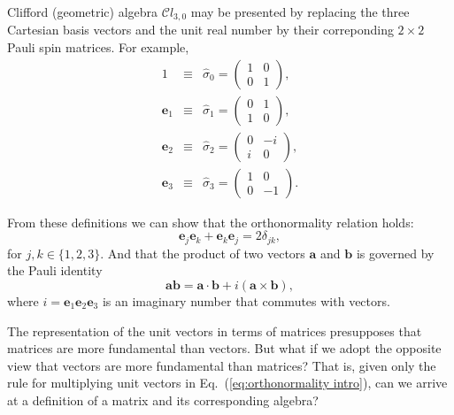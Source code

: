\documentclass[11pt,twocolumn]{article}
\begin{document}
Clifford (geometric) algebra $\mathcal Cl_{3,0}$ may be presented by replacing the three Cartesian basis vectors and the unit real number by their correponding $2\times2$ Pauli spin matrices\cite{Hestenes_1971_ajp39i9pp1013-1027_p1018}.  For example,
\begin{eqnarray}
\label{eq:unit is sigma_0}
1&\equiv&\hat\sigma_0=
\begin{pmatrix}
1&0\\
0&1
\end{pmatrix}
,\\
\label{eq:e_1 is sigma_1}
\mathbf e_1&\equiv&\hat\sigma_1=
\begin{pmatrix}
0&1\\
1&0
\end{pmatrix}
,\\
\label{eq:e_2 is sigma_2}
\mathbf e_2&\equiv&\hat\sigma_2=
\begin{pmatrix}
0&-i\\
i&0
\end{pmatrix}
,\\
\label{eq:e_3 is sigma_3}
\mathbf e_3&\equiv&\hat\sigma_3=
\begin{pmatrix}
1&0\\
0&-1
\end{pmatrix}
.
\end{eqnarray}

From these definitions we can show that the orthonormality relation holds\cite{BaylisHuschiltWei_1992_ajp60i9pp788-797_p789}:
\begin{equation}
\label{eq:orthonormality intro}
\mathbf e_j\mathbf e_k+\mathbf e_k\mathbf e_j=2\delta_{jk},
\end{equation}
for $j,k\in\{1,2,3\}$.  And that the product of two vectors $\mathbf a$ and $\mathbf b$ is governed by the Pauli identity\cite{Hestenes_2003_ajp71i2pp104-121_p110}
\begin{equation}
\label{eq:Pauli identity intro}
\mathbf a\mathbf b=\mathbf a\cdot\mathbf b+i(\mathbf a\times\mathbf b),
\end{equation}
where $i=\mathbf e_1\mathbf e_2\mathbf e_3$ is an imaginary number that commutes with vectors.

The representation of the unit vectors in terms of matrices presupposes that matrices are more fundamental than vectors.  But what if we adopt the opposite view that vectors are more fundamental than matrices?  That is, given only the rule for multiplying unit vectors in Eq.~(\ref{eq:orthonormality intro}), can we arrive at a definition of a matrix and its corresponding algebra?
\end{document}
